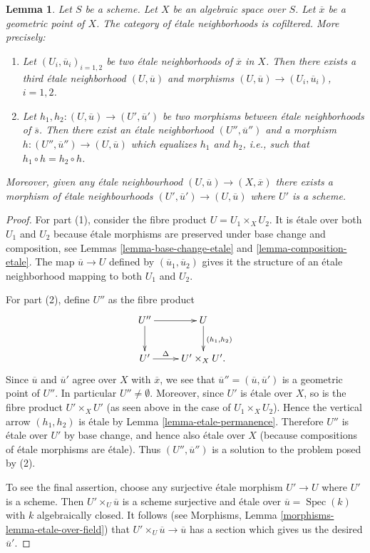 \documentclass[10pt,a4paper]{amsart}
\theoremstyle{plain}
\newtheorem{lemma}[subsection]{Lemma}
\theoremstyle{definition}
\theoremstyle{remark}
\numberwithin{equation}{subsection}
\def\Spec{\mathop{\mathrm{Spec}}}
\begin{document}
\begin{lemma}
\label{lemma-cofinal-etale}
Let $S$ be a scheme. Let $X$ be an algebraic space over $S$.
Let $\overline{x}$ be a geometric point of $X$.
The category of \'etale neighborhoods is cofiltered. More precisely:
\begin{enumerate}
\item Let $(U_i, \overline{u}_i)_{i = 1, 2}$ be two \'etale neighborhoods of
$\overline{x}$ in $X$. Then there exists a third \'etale neighborhood
$(U, \overline{u})$ and morphisms
$(U, \overline{u}) \to (U_i, \overline{u}_i)$, $i = 1, 2$.
\item Let $h_1, h_2: (U, \overline{u}) \to (U', \overline{u}')$ be two
morphisms between \'etale neighborhoods of $\overline{s}$. Then there exist an
\'etale neighborhood $(U'', \overline{u}'')$ and a morphism
$h : (U'', \overline{u}'') \to (U, \overline{u})$
which equalizes $h_1$ and $h_2$, i.e., such that
$h_1 \circ h = h_2 \circ h$.
\end{enumerate}
Moreover, given any \'etale neighbourhood
$(U, \overline{u}) \to (X, \overline{x})$
there exists a morphism of \'etale neighbourhoods
$(U', \overline{u}') \to (U, \overline{u})$
where $U'$ is a scheme.
\end{lemma}

\begin{proof}
For part (1), consider the fibre product $U = U_1 \times_X U_2$.
It is \'etale over both $U_1$ and $U_2$ because \'etale morphisms are
preserved under base change and composition, see
Lemmas \ref{lemma-base-change-etale} and \ref{lemma-composition-etale}.
The map $\overline{u} \to U$ defined by $(\overline{u}_1, \overline{u}_2)$
gives it the structure of an \'etale neighborhood mapping to both
$U_1$ and $U_2$.

\medskip\noindent
For part (2), define $U''$ as the fibre product
$$
\xymatrix{
U'' \ar[r] \ar[d] & U \ar[d]^{(h_1, h_2)} \\
U' \ar[r]^-\Delta & U' \times_X U'.
}
$$
Since $\overline{u}$ and $\overline{u}'$ agree over $X$ with $\overline{x}$,
we see that $\overline{u}'' = (\overline{u}, \overline{u}')$ is a geometric
point of $U''$. In particular $U'' \not = \emptyset$.
Moreover, since $U'$ is \'etale over $X$, so is the fibre product
$U'\times_X U'$ (as seen above in the case of $U_1 \times_X U_2$).
Hence the vertical arrow $(h_1, h_2)$ is \'etale by
Lemma \ref{lemma-etale-permanence}.
Therefore $U''$ is \'etale over $U'$ by base change, and hence also
\'etale over $X$ (because compositions of \'etale morphisms are \'etale).
Thus $(U'', \overline{u}'')$ is a solution to the problem posed by (2).

\medskip\noindent
To see the final assertion, choose any surjective \'etale morphism
$U' \to U$ where $U'$ is a scheme. Then
$U' \times_U \overline{u}$ is a scheme surjective and \'etale over
$\overline{u} = \Spec(k)$ with $k$ algebraically closed.
It follows (see
Morphisms, Lemma \ref{morphisms-lemma-etale-over-field})
that $U' \times_U \overline{u} \to \overline{u}$ has a section
which gives us the desired $\overline{u}'$.
\end{proof}
\end{document}
